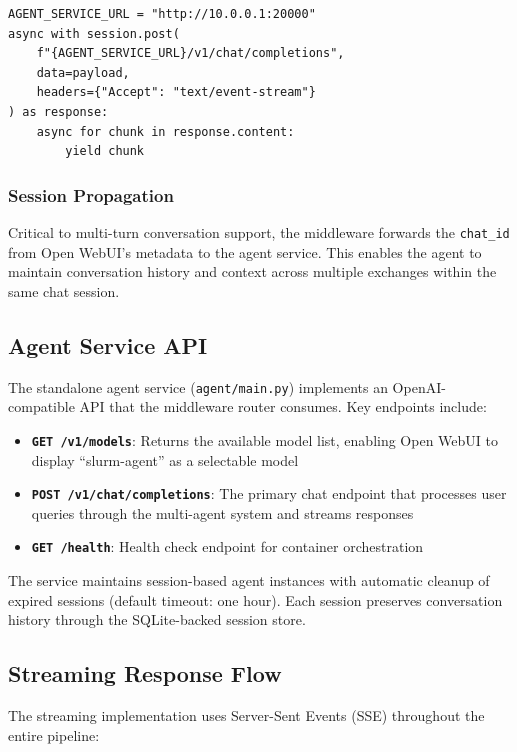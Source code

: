 \begin{verbatim}
AGENT_SERVICE_URL = "http://10.0.0.1:20000"
async with session.post(
    f"{AGENT_SERVICE_URL}/v1/chat/completions",
    data=payload,
    headers={"Accept": "text/event-stream"}
) as response:
    async for chunk in response.content:
        yield chunk
\end{verbatim}

\subsubsection{Session Propagation}

Critical to multi-turn conversation support, the middleware forwards the \texttt{chat\_id} from Open WebUI's metadata to the agent service. This enables the agent to maintain conversation history and context across multiple exchanges within the same chat session.

\subsection{Agent Service API}

The standalone agent service (\texttt{agent/main.py}) implements an OpenAI-compatible API that the middleware router consumes. Key endpoints include:

\begin{itemize}
    \item \textbf{\texttt{GET /v1/models}}: Returns the available model list, enabling Open WebUI to display ``slurm-agent'' as a selectable model
    \item \textbf{\texttt{POST /v1/chat/completions}}: The primary chat endpoint that processes user queries through the multi-agent system and streams responses
    \item \textbf{\texttt{GET /health}}: Health check endpoint for container orchestration
\end{itemize}

The service maintains session-based agent instances with automatic cleanup of expired sessions (default timeout: one hour). Each session preserves conversation history through the SQLite-backed session store.

\subsection{Streaming Response Flow}

The streaming implementation uses Server-Sent Events (SSE) throughout the entire pipeline:

